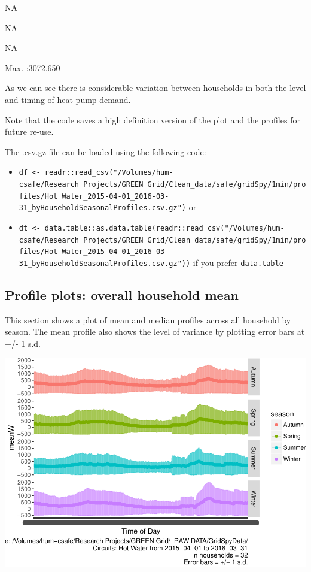 \documentclass[]{article}
\providecommand{\tightlist}{%
  \setlength{\itemsep}{0pt}\setlength{\parskip}{0pt}}
\begin{document}
NA

NA

NA

Max. :3072.650

As we can see there is considerable variation between households in both
the level and timing of heat pump demand.

Note that the code saves a high definition version of the plot and the
profiles for future re-use.

The .csv.gz file can be loaded using the following code:

\begin{itemize}
\tightlist
\item
  \texttt{df\ \textless{}-\ readr::read\_csv("/Volumes/hum-csafe/Research\ Projects/GREEN\ Grid/Clean\_data/safe/gridSpy/1min/profiles/Hot\ Water\_2015-04-01\_2016-03-31\_byHouseholdSeasonalProfiles.csv.gz")}
  or
\item
  \texttt{dt\ \textless{}-\ data.table::as.data.table(readr::read\_csv("/Volumes/hum-csafe/Research\ Projects/GREEN\ Grid/Clean\_data/safe/gridSpy/1min/profiles/Hot\ Water\_2015-04-01\_2016-03-31\_byHouseholdSeasonalProfiles.csv.gz"))}
  if you prefer \texttt{data.table}
\end{itemize}

\subsection{Profile plots: overall household
mean}\label{profile-plots-overall-household-mean}

This section shows a plot of mean and median profiles across all
household by season. The mean profile also shows the level of variance
by plotting error bars at +/- 1 s.d.

\includegraphics{nzGGHouseholdPowerDemandProfile_Hot Water_2015-04-01_2016-03-31_files/figure-latex/overall profiles by season-1.pdf}
\end{document}

